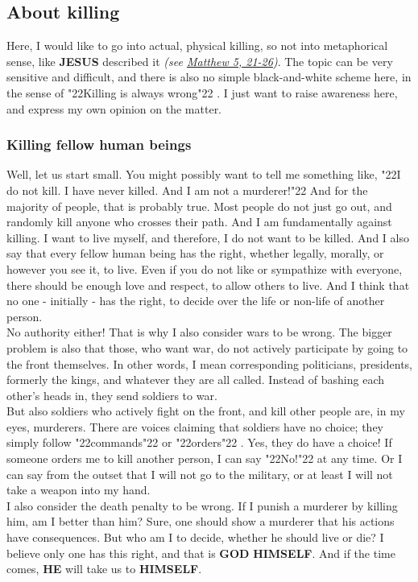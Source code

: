\documentclass[10pt,a5paper]{article}
\newcommand{\God}[0]{\textbf{GOD}}
\newcommand{\He}[0]{\textbf{HE}}
\newcommand{\Himself}[0]{\textbf{HIMSELF}}
\newcommand{\Jesus}[0]{\textbf{JESUS}}
\newcommand{\q}[1]{\char"22{#1}\char"22 }
\begin{document}
	\subsection{About killing} \label{VomToeten}
		Here,
		I would like to go into actual,
		physical killing,
		so not into metaphorical sense,
		like {\Jesus} described it
		\textit{(see \href{https://www.die-bibel.de/bibeln/online-bibeln/lesen/ESV/MAT.5/Matthew-5}{Matthew 5, 21-26})}.
		The topic can be very sensitive and difficult,
		and there is also no simple black-and-white scheme here,
		in the sense of \q{Killing is always wrong}.
		I just want to raise awareness here,
		and express my own opinion on the matter.

	\subsubsection{Killing fellow human beings}
		Well,
		let us start small.
		You might possibly want to tell me something like,
		\q{I do not kill.
		I have never killed.
		And I am not a murderer!}
		And for the majority of people,
		that is probably true.
		Most people do not just go out,
		and randomly kill anyone who crosses their path.
		And I am fundamentally against killing.
		I want to live myself,
		and therefore,
		I do not want to be killed.
		And I also say that every fellow human being has the right,
		whether legally,
		morally,
		or however you see it,
		to live.
		Even if you do not like or sympathize with everyone,
		there should be enough love and respect,
		to allow others to live.
		And I think that no one - initially - has the right,
		to decide over the life or non-life of another person.
		\\
		No authority either!
		That is why I also consider wars to be wrong.
		The bigger problem is also that those,
		who want war,
		do not actively participate by going to the front themselves.
		In other words,
		I mean corresponding politicians,
		presidents,
		formerly the kings,
		and whatever they are all called.
		Instead of bashing each other's heads in,
		they send soldiers to war.
		\\
		But also soldiers who actively fight on the front,
		and kill other people are,
		in my eyes,
		murderers.
		There are voices claiming that soldiers have no choice;
		they simply follow \q{commands} or \q{orders}.
		Yes,
		they do have a choice!
		If someone orders me to kill another person,
		I can say \q{No!} at any time.
		Or I can say from the outset that I will not go to the military,
		or at least I will not take a weapon into my hand.
		\\
		I also consider the death penalty to be wrong.
		If I punish a murderer by killing him,
		am I better than him?
		Sure,
		one should show a murderer that his actions have consequences.
		But who am I to decide,
		whether he should live or die?
		I believe only one has this right,
		and that is {\God} {\Himself}.
		And if the time comes,
		{\He} will take us to {\Himself}.
		
\end{document}
